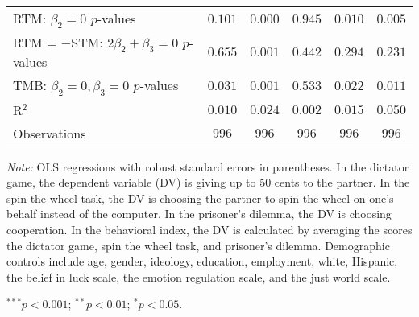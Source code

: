 \begin{table}[!t]
\begin{center}
{\begin{threeparttable}
\begin{tabular}{l c c c c c}
RTM: $\beta_2 = 0$ $p$-values                   & $0.101$        & $0.000$       & $0.945$       & $0.010$      & $0.005$       \\
RTM = $-$STM: $2\beta_2+\beta_3 = 0$ $p$-values & $0.655$        & $0.001$       & $0.442$       & $0.294$      & $0.231$       \\
TMB: $\beta_2 = 0, \beta_3 = 0$ $p$-values      & $0.031$        & $0.001$       & $0.533$       & $0.022$      & $0.011$       \\
R$^2$                                           & $0.010$        & $0.024$       & $0.002$       & $0.015$      & $0.050$       \\
Observations                                    & $996$          & $996$         & $996$         & $996$        & $996$         \\
\bottomrule
\end{tabular}
\begin{tablenotes}[flushleft]
\scriptsize{\item[\hspace{-5mm}] \textit{Note:} OLS regressions with robust standard errors in parentheses. 
                                In the dictator game, the dependent variable (DV) is giving up to 50 cents to the partner. 
                                In the spin the wheel task, the DV is choosing the partner to spin the wheel on one’s behalf instead of the computer. 
                                In the prisoner’s dilemma, the DV is choosing cooperation. 
                                In the behavioral index, the DV is calculated by averaging the scores the dictator game, spin the wheel task, and prisoner's dilemma.
                                Demographic controls include age, gender, ideology,
                                education, employment, white, Hispanic, the belief in luck scale, the emotion regulation scale, and the just world scale. \item[\hspace{-5mm}] $^{***}p<0.001$; $^{**}p<0.01$; $^{*}p<0.05$.}
\end{tablenotes}
\end{threeparttable}
}
\label{tab:behavior_opposite_regression}
\end{center}
\end{table}

\renewcommand{\baselinestretch}{1.67}%
